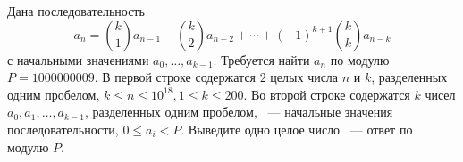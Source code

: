 Дана последовательность
$$
a_n = \binom{k}{1} a_{n-1} - \binom{k}{2} a_{n-2} + \cdots
+ (-1)^{k+1}\binom{k}{k} a_{n-k}
$$
с начальными значениями $a_0, \ldots, a_{k - 1}$. Требуется найти
$a_n$ по модулю $P = 1000000009$.
\InputFile
В первой строке содержатся $2$ целых числа $n$ и $k$, разделенных
одним пробелом, $k \le n \le 10^{18}, 1 \le k \le 200$.
Во второй строке содержатся $k$ чисел $a_0, a_1, \ldots, a_{k-1}$,
разделенных одним пробелом, ~--- начальные значения последовательности,
$0 \le a_i < P$.
\OutputFile
Выведите одно целое число ~--- ответ по модулю $P$.


